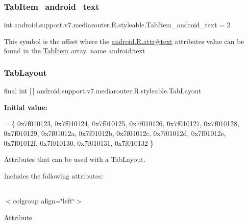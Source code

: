 \subsubsection{\texorpdfstring{Tab\+Item\+\_\+android\+\_\+text}{TabItem\_android\_text}}
{\footnotesize\ttfamily int android.\+support.\+v7.\+mediarouter.\+R.\+styleable.\+Tab\+Item\+\_\+android\+\_\+text = 2\hspace{0.3cm}{\ttfamily [static]}}

This symbol is the offset where the \hyperlink{}{android.\+R.\+attr\#text} attribute\textquotesingle{}s value can be found in the \hyperlink{classandroid_1_1support_1_1v7_1_1mediarouter_1_1R_1_1styleable_a42bb997a8b3e8b983afbbea7a8ee301a}{Tab\+Item} array.  name android\+:text \mbox{\label{classandroid_1_1support_1_1v7_1_1mediarouter_1_1R_1_1styleable_a94de1350e0a902b4a974d775f2f4f25e}} 
\subsubsection{\texorpdfstring{Tab\+Layout}{TabLayout}}
{\footnotesize\ttfamily final int \mbox{[}$\,$\mbox{]} android.\+support.\+v7.\+mediarouter.\+R.\+styleable.\+Tab\+Layout\hspace{0.3cm}{\ttfamily [static]}}

{\bfseries Initial value\+:}
\begin{DoxyCode}
= \{
            0x7f010123, 0x7f010124, 0x7f010125, 0x7f010126,
            0x7f010127, 0x7f010128, 0x7f010129, 0x7f01012a,
            0x7f01012b, 0x7f01012c, 0x7f01012d, 0x7f01012e,
            0x7f01012f, 0x7f010130, 0x7f010131, 0x7f010132
        \}
\end{DoxyCode}
Attributes that can be used with a Tab\+Layout. 

Includes the following attributes\+:

\tabulinesep=1mm
\begin{longtabu} spread 0pt [c]{*{0}{|X[-1]}|}
\hline
\end{longtabu}
$<$colgroup align=\char`\"{}left\char`\"{}$>$ 

Attribute

